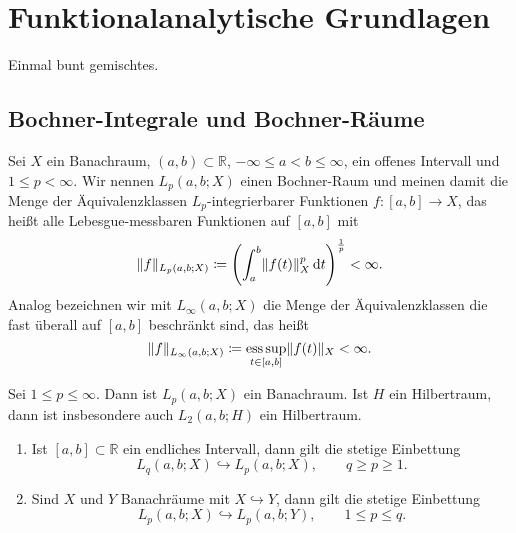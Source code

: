 
\chapter{Funktionalanalytische Grundlagen} %
\label{cha:funktionalanalytische_grundlagen}

Einmal bunt gemischtes.

\section{Bochner-Integrale und Bochner-Räume} %
\label{sec:bochner_r_ume}

\begin{Definition}
    Sei $X$ ein Banachraum, $(a, b) \subset \mathbb{R}$, $- \infty \leq a < b \leq \infty$, ein offenes Intervall und $1 \leq p < \infty$.
    Wir nennen $L_{p}(a, b; X)$ einen Bochner-Raum und meinen damit die Menge der Äquivalenzklassen $L_{p}$-integrierbarer Funktionen $f \colon [a, b] \to X$, das heißt alle Lebesgue-messbaren Funktionen auf $[a, b]$ mit
    \begin{equation}
        \lVert f\rVert_{L_{p}(a, b; X)} \coloneqq \left( \int_{a}^{b} \lVert f(t)\rVert_{X}^{p} \mathop{}\!\mathrm{d} t \right)^{\frac 1 p} < \infty.
    \end{equation}
    Analog bezeichnen wir mit $L_{\infty}(a, b; X)$ die Menge der Äquivalenzklassen die fast überall auf $[a, b]$ beschränkt sind, das heißt
    \begin{equation}
        \lVert f\rVert_{L_{\infty}(a, b; X)} \coloneqq \operatorname*{ess\,sup}_{t \in [a, b]} \lVert f(t)\rVert_{X} < \infty.
    \end{equation}
\end{Definition}

\begin{Lemma}
    Sei $1 \leq p \leq \infty$. Dann ist $L_{p}(a, b; X)$ ein Banachraum.
    Ist $H$ ein Hilbertraum, dann ist insbesondere auch $L_{2}(a, b; H)$ ein Hilbertraum.
\end{Lemma}

\begin{Lemma}[Eigenschaften]
    \begin{enumerate}
        \item Ist $[a, b] \subset \mathbb{R}$ ein endliches Intervall, dann gilt die stetige Einbettung
        \begin{equation}
            L_{q}(a, b; X) \hookrightarrow L_{p}(a, b; X), \qquad q \geq p \geq 1.
        \end{equation}
        \item Sind $X$ und $Y$ Banachräume mit $X \hookrightarrow Y$, dann gilt die stetige Einbettung
        \begin{equation}
            L_{p}(a, b; X) \hookrightarrow L_{p}(a, b; Y), \qquad 1 \leq p \leq q.
        \end{equation}
    \end{enumerate}
\end{Lemma}
